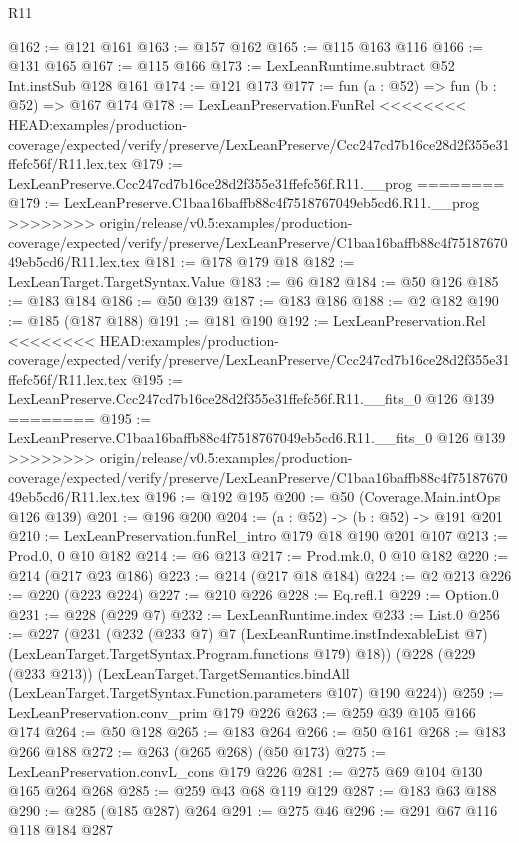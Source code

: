 \begin{lexlean}{R11}
\begin{coremodule}
{{{{{@162 := @121 @161
@163 := @157 @162
@165 := @115 @163 @116
@166 := @131 @165
@167 := @115 @166
@173 := LexLeanRuntime.subtract @52 Int.instSub @128 @161
@174 := @121 @173
@177 := fun (a : @52) => fun (b : @52) => @167 @174
@178 := LexLeanPreservation.FunRel
<<<<<<<< HEAD:examples/production-coverage/expected/verify/preserve/LexLeanPreserve/Ccc247cd7b16ce28d2f355e31ffefc56f/R11.lex.tex
@179 := LexLeanPreserve.Ccc247cd7b16ce28d2f355e31ffefc56f.R11.__prog
========
@179 := LexLeanPreserve.C1baa16baffb88c4f7518767049eb5cd6.R11.__prog
>>>>>>>> origin/release/v0.5:examples/production-coverage/expected/verify/preserve/LexLeanPreserve/C1baa16baffb88c4f7518767049eb5cd6/R11.lex.tex
@181 := @178 @179 @18
@182 := LexLeanTarget.TargetSyntax.Value
@183 := @6 @182
@184 := @50 @126
@185 := @183 @184
@186 := @50 @139
@187 := @183 @186
@188 := @2 @182
@190 := @185 (@187 @188)
@191 := @181 @190
@192 := LexLeanPreservation.Rel
<<<<<<<< HEAD:examples/production-coverage/expected/verify/preserve/LexLeanPreserve/Ccc247cd7b16ce28d2f355e31ffefc56f/R11.lex.tex
@195 := LexLeanPreserve.Ccc247cd7b16ce28d2f355e31ffefc56f.R11.__fits_0 @126 @139
========
@195 := LexLeanPreserve.C1baa16baffb88c4f7518767049eb5cd6.R11.__fits_0 @126 @139
>>>>>>>> origin/release/v0.5:examples/production-coverage/expected/verify/preserve/LexLeanPreserve/C1baa16baffb88c4f7518767049eb5cd6/R11.lex.tex
@196 := @192 @195
@200 := @50 (Coverage.Main.intOps @126 @139)
@201 := @196 @200
@204 := (a : @52) -> (b : @52) -> @191 @201
@210 := LexLeanPreservation.funRel_intro @179 @18 @190 @201 @107
@213 := Prod.{0, 0} @10 @182
@214 := @6 @213
@217 := Prod.mk.{0, 0} @10 @182
@220 := @214 (@217 @23 @186)
@223 := @214 (@217 @18 @184)
@224 := @2 @213
@226 := @220 (@223 @224)
@227 := @210 @226
@228 := Eq.refl.{1}
@229 := Option.{0}
@231 := @228 (@229 @7)
@232 := LexLeanRuntime.index
@233 := List.{0}
@256 := @227
    (@231
      (@232
        (@233 @7)
        @7
        (LexLeanRuntime.instIndexableList @7)
        (LexLeanTarget.TargetSyntax.Program.functions @179)
        @18))
    (@228
      (@229 (@233 @213))
      (LexLeanTarget.TargetSemantics.bindAll
        (LexLeanTarget.TargetSyntax.Function.parameters @107)
        @190
        @224))
@259 := LexLeanPreservation.conv_prim @179 @226
@263 := @259 @39 @105 @166 @174
@264 := @50 @128
@265 := @183 @264
@266 := @50 @161
@268 := @183 @266 @188
@272 := @263 (@265 @268) (@50 @173)
@275 := LexLeanPreservation.convL_cons @179 @226
@281 := @275 @69 @104 @130 @165 @264 @268
@285 := @259 @43 @68 @119 @129
@287 := @183 @63 @188
@290 := @285 (@185 @287) @264
@291 := @275 @46
@296 := @291 @67 @116 @118 @184 @287
}}}}}
\end{coremodule}
\end{lexlean}
